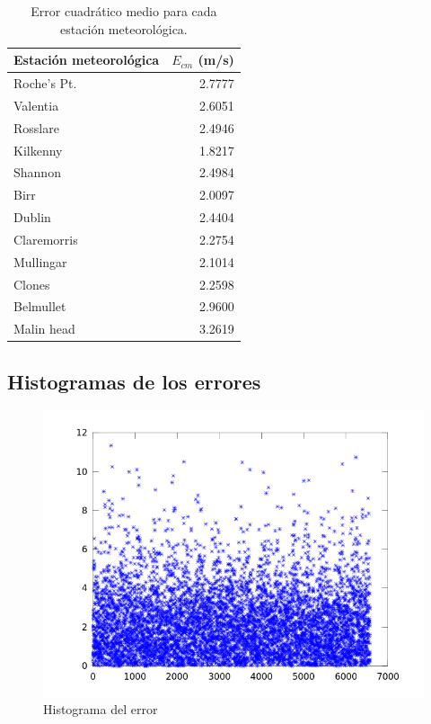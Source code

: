 \documentclass[journal, monochrome]{IEEEtran}
\begin{document}
\begin{table}
	\begin{center}
		\begin{tabular}{l|r}
			Estación meteorológica & $E_{cm}$ (m/s) \\
			\hline
			Roche's Pt. & 2.7777 \\ 
			Valentia & 2.6051 \\
			Rosslare & 2.4946 \\
			Kilkenny & 1.8217 \\
			Shannon & 2.4984 \\
			Birr & 2.0097 \\
			Dublin & 2.4404 \\
			Claremorris & 2.2754 \\
			Mullingar & 2.1014 \\
			Clones & 2.2598 \\
			Belmullet & 2.9600 \\
			Malin head & 3.2619 \\
		\end{tabular}
		\caption{Error cuadrático medio para cada estación meteorológica.}
		\label{table:ecm}
	\end{center}
\end{table}


\vspace{0.5cm}
\subsection{Histogramas de los errores}

\begin{figure}[h]
	\begin{center}
		\includegraphics[scale = 0.5]{img/histo.png}
		\caption{Histograma del error}
		\label{figure:histo}
	\end{center}
\end{figure}
\end{document}

